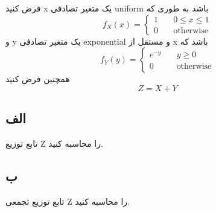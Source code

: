 فرض کنید x یک متغیر تصادفی uniform باشد به طوری که 
$$
f_X(x) = 
\begin{cases}
	1 &\quad 0 \le x \le 1 \\
	0 &\quad \text{otherwise}
\end{cases}
$$
و y یک متغیر تصادفی exponential و مستقل از x باشد که
$$
f_Y(y) =
\begin{cases}
	e^{-y} &\quad y \ge 0 \\
	0 &\quad \text{otherwise}
\end{cases}
$$
همچنین فرض کنید
$$
Z = X + Y
$$

\subsection*{الف}
تابع توزیع Z را محاسبه کنید.

\subsection*{ب}
تابع توزیع تجمعی Z را محاسبه کنید.
